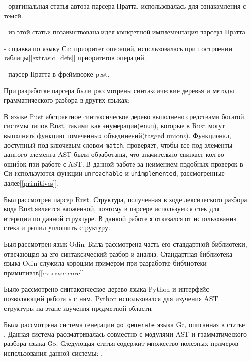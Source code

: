  - оригинальная статья автора парсера Пратта, использовалась для ознакомления с темой.

 - из этой статьи позаимствована идея конкретной имплементация парсера Пратта.

 - справка по языку Си: приоритет операций, использовалась при построении таблицы[\ref{extras:c_defs}] приоритетов операций.

 - парсер Пратта в фреймворке pest.

При разработке парсера были рассмотрены синтаксические деревья и методы грамматического разбора в других языках:

В языке Rust абстрактное синтаксическое дерево\cite{rust-ast} выполнено средствами богатой системы типов Rust, 
такими как энумерации(\verb|enum|), которые в Rust могут выполнять функцию помеченных объединений(tagged unions).
Функционал, доступный под ключевым словом \verb|match|, проверяет, чтобы все под-элементы данного элемента AST были обработаны,
что значительно снижает кол-во ошибок при работе с AST. В данной работе за неимением подобных проверок в Си используются 
функции  \verb|unreachable| и \verb|unimplemented|, рассмотренные далее[\ref{primitives}].

Был рассмотрен парсер Rust\cite{rustc-parser}.
Структура, полученная в ходе лексического разбора кода Rust является вложенной, поэтому в парсере используется стек для итерации по данной структуре.
В данной работе я отказался от использования стека и решил уплощить структуру.


Был рассмотрен язык Odin. Была рассмотрена часть его стандартной библиотеки, отвечающая за его синтаксический разбор и анализ\cite{odin-parser}.
Стандартная библиотека языка Odin служила хорошим примером при разработке библиотеки примитивов[\ref{extras:c-core}]

Было рассмотрено синтаксическое дерево языка Python\cite{python-ast} и интерфейс позволяющий работать с ним. 
Python использовался для изучения AST структуры на этапе изучения предметной области.


Была рассмотрена система генерации \verb|go generate| языка Go, описанная в статье .
Данная система рассматривалась совместно с модулями AST\cite{go-ast} и грамматического разбора\cite{go-parser} языка Go.
Следующая статья содержит множество полезных примеров использования данной системы: .

